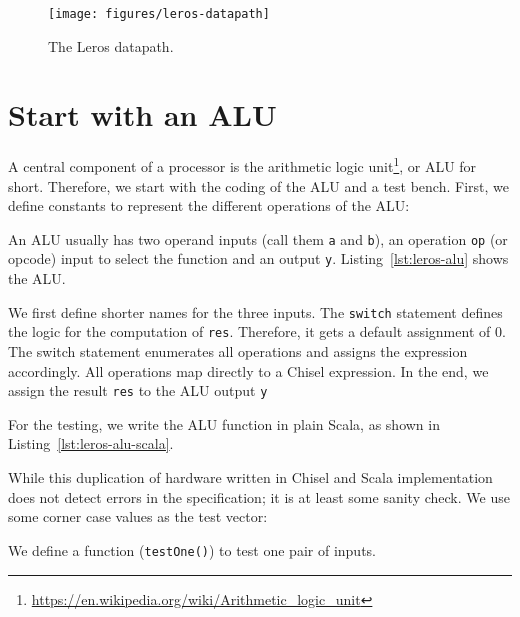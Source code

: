 \documentclass[%
    10pt,
    headinclude, footexclude,
    openright, %
    notitlepage,
    cleardoubleempty,
    headsepline,
    pointlessnumbers,
    bibtotoc, idxtotoc,
    ]{scrbook}
\newcommand{\code}[1]{{\lstinline[basicstyle=\small\ttfamily]{#1}}}
\newcommand{\todo}[1]{{\emph{TODO: #1}}}
\newcommand{\myref}[2]{\href{#1}{#2}}
\renewcommand{\myref}[2]{{#2}{\footnote{\url{#1}}}}
\renewcommand{\todo}[1]{}
\begin{document}
\begin{figure}
  \centering
  \texttt{[image: figures/leros-datapath]}
  \caption{The Leros datapath.}
  \label{fig:leros-datapath}
\end{figure}

\section{Start with an ALU}


A central component of a processor is the
\myref{https://en.wikipedia.org/wiki/Arithmetic_logic_unit}{arithmetic logic unit}, or ALU for short.
Therefore, we start with the coding of the ALU and a test bench.
First, we define constants to represent the different operations of the ALU:


\noindent An ALU usually has two operand inputs (call them \code{a} and \code{b}), an operation \code{op}
(or opcode) input to select the function and an output \code{y}.
Listing~\ref{lst:leros-alu} shows the ALU.

\todo{draw a nice ALU, see Wikipedia}



We first define shorter names for the three inputs. The \code{switch} statement defines the
logic for the computation of \code{res}. Therefore, it gets a default assignment of 0.
The switch statement enumerates all operations and assigns the expression accordingly.
All operations map directly to a Chisel expression.
In the end, we assign the result \code{res} to the ALU output \code{y}


For the testing, we write the ALU function in plain Scala, as shown in Listing~\ref{lst:leros-alu-scala}.


\noindent While this duplication of hardware written in Chisel and Scala implementation does not
detect errors in the specification; it is at least some sanity check.
We use some corner case values as the test vector:

\newpage
{}

\noindent We define a function (\code{testOne()}) to test one pair of inputs.
\end{document}
